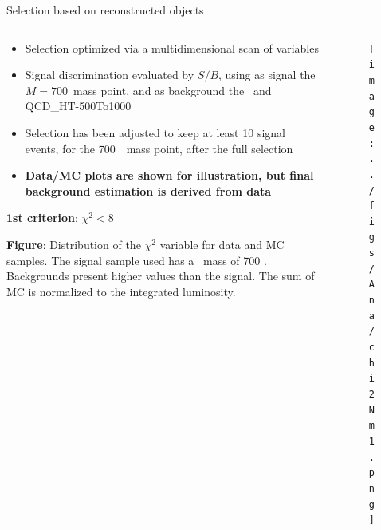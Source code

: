 \begin{frame}{Selection based on reconstructed objects}
\vspace{-.2cm}
\scriptsize

\begin{columns}
\begin{column}{.50\textwidth}
\vspace{-.2cm}
\begin{block}{}
\tiny
\begin{itemize}
\item Selection optimized via a multidimensional scan of variables 
\item Signal discrimination evaluated by $S/B$, using as signal the $M=700$\GeVcc~mass point, and as background the \ttbar~and QCD\_HT-500To1000
\item Selection has been adjusted to keep at least 10 signal events, for the 700~\GeVcc~mass point, after the full selection
\item \textbf{Data/MC plots are shown for illustration, but final background estimation is derived from data}
\end{itemize}
\end{block}
\vspace{-.2cm}
\begin{block}{}
\scriptsize \textbf{1st criterion}: $\chi^{2}<8$
\end{block}
\vspace{-.2cm}
\begin{block}{}
\scriptsize \textbf{Figure}: Distribution of the $\chi^{2}$ variable for data and MC samples. The signal sample used has a \Tp~mass of 700 \GeVcc. Backgrounds present higher values than the signal. The sum of MC is normalized to the integrated luminosity.
\end{block}
\end{column}

\begin{column}{.50\textwidth}
\begin{figure}[!Hhtbp]
  \begin{center}
    \texttt{[image: ../figs/Ana/chi2Nm1.png]}
  \end{center}
\end{figure}
\end{column}

\end{columns}

\end{frame}

